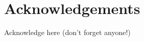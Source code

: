 \pagestyle{empty}
\fancyhead[LO]{\leftmark}   
\chapter*{Acknowledgements}
\pagestyle{fancy}

Acknowledge here (don't forget anyone!)
